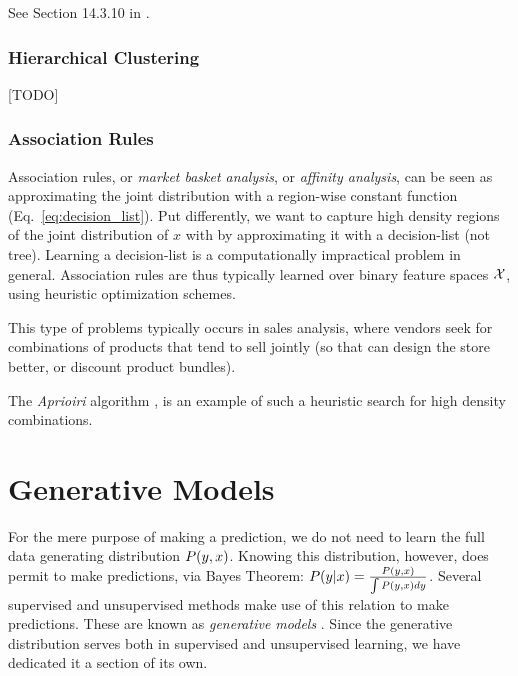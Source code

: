 See Section 14.3.10 in \cite{hastie_elements_2003}.


\subsubsection{Hierarchical Clustering}
\label{sec:hierarchical}
[TODO]



\subsubsection{Association Rules}
\label{sec:association}
Association rules, or \emph{market basket analysis}, or \emph{affinity analysis}, can be seen as approximating the joint distribution with a region-wise constant function (Eq.~\ref{eq:decision_list}).
Put differently, we want to capture high density regions of the joint distribution of $x$ with by approximating it with a decision-list (not tree).
Learning a decision-list is a computationally impractical problem in general. Association rules are thus typically learned over binary feature spaces $\mathcal{X}$, using heuristic optimization schemes.

This type of problems typically occurs in sales analysis, where vendors seek for combinations of products that tend to sell jointly (so that can design the store better, or discount product bundles).

The \emph{Aprioiri} algorithm \cite{agraval_fast_1994}, is an example of such a heuristic search for high density combinations.








\section{Generative Models}
For the mere purpose of making a prediction, we do not need to learn the full data generating distribution $P(y,x)$. 
Knowing this distribution, however, does permit to make predictions, via Bayes Theorem: 
$P(y|x)=\frac{P(y,x)}{\int P(y,x)dy}$.
Several supervised and unsupervised methods make use of this relation to make predictions. These are known as \emph{generative models} .
Since the generative distribution serves both in supervised and unsupervised learning, we have dedicated it a section of its own.

